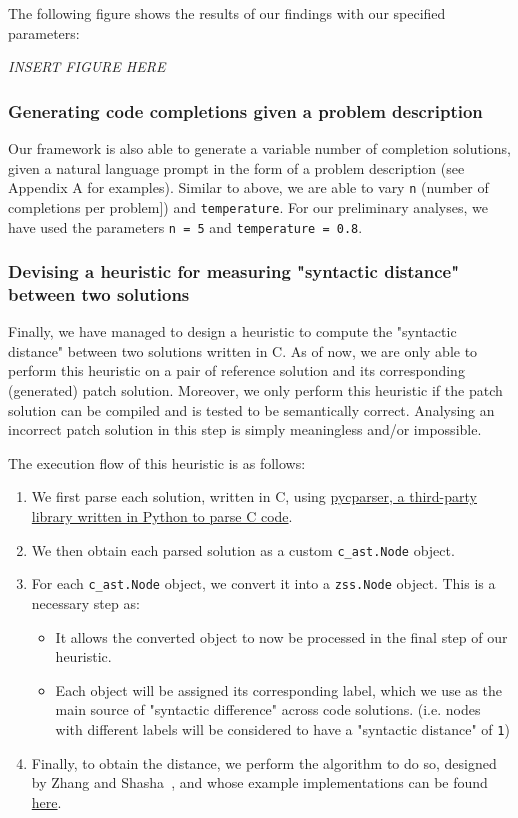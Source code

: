 The following figure shows the results of our findings with our specified parameters:

\textit{INSERT FIGURE HERE}

\subsubsection{Generating code completions given a problem description}

Our framework is also able to generate a variable number of completion solutions, given a natural
language prompt in the form of a problem description (see Appendix A for examples).
Similar to above, we are able to vary \texttt{n} (number of completions per problem]) and
\texttt{temperature}.
For our preliminary analyses, we have used the parameters \texttt{n = 5} and
\texttt{temperature = 0.8}.


\subsubsection{Devising a heuristic for measuring "syntactic distance" between two solutions}

Finally, we have managed to design a heuristic to compute the "syntactic distance" between two solutions
written in C.
As of now, we are only able to perform this heuristic on a pair of reference solution and its corresponding
(generated) patch solution.
Moreover, we only perform this heuristic if the patch solution can be compiled and is tested to be
semantically correct.
Analysing an incorrect patch solution in this step is simply meaningless and/or impossible.

The execution flow of this heuristic is as follows:
\begin{enumerate}
    \item We first parse each solution, written in C, using
          \href{https://github.com/eliben/pycparser}{pycparser, a third-party library written in Python
                to parse C code}.
    \item We then obtain each parsed solution as a custom \texttt{c\_ast.Node} object.
    \item For each \texttt{c\_ast.Node} object, we convert it into a \texttt{zss.Node} object.
          This is a necessary step as:
    \begin{itemize}
        \item It allows the converted object to now be processed in the final step of our heuristic.
        \item Each object will be assigned its corresponding label, which we use as the main source
              of "syntactic difference" across code solutions. (i.e. nodes with different labels
              will be considered to have a "syntactic distance" of \texttt{1})
    \end{itemize}
    \item Finally, to obtain the distance, we perform the algorithm to do so, designed by
          Zhang and Shasha~\cite{zhang1989simple}, and whose example implementations can be found
          \href{https://pythonhosted.org/zss/#module-zss}{here}.
\end{enumerate}